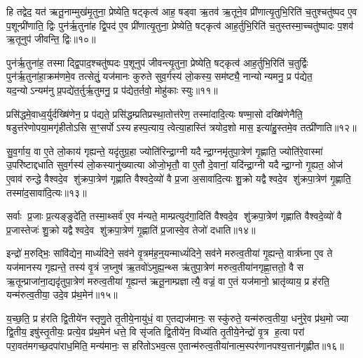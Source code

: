 हि तद्वेद॒ यत॑ ऋतू॒नाम्मुख॑मृ॒तुना॒ प्रेष्येति॒ षट्कृत्व॑ आह॒ षड्वा ऋ॒तव॑ ऋ॒तूने॒व प्री॑णात्यृ॒तुभि॒रिति॑ च॒तुश्चतु॑ष्पद ए॒व प॒शून्प्री॑णाति॒ द्विः पुन॑र्\mbox{}ऋ॒तुना॑ह द्वि॒पद॑ ए॒व प्री॑णात्यृ॒तुना॒ प्रेष्येति॒ षट्कृत्व॑ आह॒र्तुभि॒रिति॑ च॒तुस्तस्मा॒च्चतु॑ष्पादः प॒शव॑ ऋ॒तूनुप॑ जीवन्ति॒ द्विः॥१०॥

पुन॑र्\mbox{}ऋ॒तुना॑ह॒ तस्माद्द्वि॒पाद॒श्चतु॑ष्पदः प॒शूनुप॑ जीवन्त्यृ॒तुना॒ प्रेष्येति॒ षट्कृत्व॑ आह॒र्तुभि॒रिति॑ च॒तुर्द्विः पुन॑र्\mbox{}ऋ॒तुना॑हा॒क्रम॑णमे॒व तत्सेतुं॒ यज॑मानः कुरुते सुव॒र्गस्य॑ लो॒कस्य॒ सम॑ष्ट्यै॒ नान्योन्यमनु॒ प्र प॑द्येत॒ यद॒न्योऽन्यम॑नु प्र॒पद्ये॑त॒र्तुर्\mbox{}ऋ॒तुमनु॒ प्र प॑द्येत॒र्तवो॒ मोहु॑काः स्युः॥११॥

प्रसि॑द्धमे॒वाध्व॒र्युर्दख्षि॑णेन॒ प्र प॑द्यते॒ प्रसि॑द्धम्प्रतिप्रस्था॒तोत्त॑रेण॒ तस्मा॑दादि॒त्यः षण्मा॒सो दख्षि॑णेनैति॒ षडुत्त॑रेणोपया॒मगृ॑हीतोऽसि स॒ꣳ॒सर्पोऽस्यहस्प॒त्याय॒ त्वेत्या॒हास्ति॑ त्रयोद॒शो मास॒ इत्या॑हु॒स्तमे॒व तत्प्री॑णाति॥१२॥

{\anuvakamend[{को जी॑वन्ति॒ द्विः स्यु॒श्चतु॑स्त्रिशच्च॥३॥}]}

सु॒व॒र्गाय॒ वा ए॒ते लो॒काय॑ गृह्यन्ते॒ यदृ॑तुग्र॒हा ज्योति॑रिन्द्रा॒ग्नी यदैन्द्रा॒ग्नमृ॑तुपा॒त्रेण॑ गृ॒ह्णाति॒ ज्योति॑रे॒वास्मा॑ उ॒परि॑ष्टाद्दधाति सुव॒र्गस्य॑ लो॒कस्यानु॑ख्यात्या ओजो॒भृतौ॒ वा ए॒तौ दे॒वानां॒ यदि॑न्द्रा॒ग्नी यदैन्द्रा॒ग्नो गृ॒ह्यत॒ ओज॑ ए॒वाव॑ रुन्द्धे वैश्वदे॒व शु॑क्रपा॒त्रेण॑ गृह्णाति वैश्वदे॒व्यो॑ वै प्र॒जा अ॒सावा॑दि॒त्यः शु॒क्रो यद्वैश्वदे॒व शु॑क्रपा॒त्रेण॑ गृ॒ह्णाति॒ तस्मा॑द॒सावा॑दि॒त्यः॥१३॥

सर्वाः प्र॒जाः प्र॒त्यङ्ङुदे॑ति॒ तस्मा॒थ्सर्व॑ ए॒व म॑न्यते॒ माम्प्रत्युद॑गा॒दिति॑ वैश्वदे॒व शु॑क्रपा॒त्रेण॑ गृह्णाति वैश्वदे॒व्यो॑ वै प्र॒जास्तेजः॑ शु॒क्रो यद्वैश्वदे॒व शु॑क्रपा॒त्रेण॑ गृ॒ह्णाति॑ प्र॒जास्वे॒व तेजो॑ दधाति॥१४॥

{\anuvakamend[{तस्मा॑द॒सावा॑दि॒त्यस्त्रि॒ꣳ॒शच्च॑॥४॥}]}

इन्द्रो॑ म॒रुद्भिः॒ सांवि॑द्येन॒ माध्यं॑दिने॒ सव॑ने वृ॒त्रम॑ह॒न्॒यन्माध्यं॑दिने॒ सव॑ने मरुत्व॒तीया॑ गृ॒ह्यन्ते॒ वार्त्र॑घ्ना ए॒व ते यज॑मानस्य गृह्यन्ते॒ तस्य॑ वृ॒त्रं ज॒घ्नुष॑ ऋ॒तवो॑ऽमुह्य॒न्थ्स ऋ॑तुपा॒त्रेण॑ मरुत्व॒तीया॑नगृह्णा॒त्ततो॒ वै स ऋ॒तून्प्राजा॑ना॒द्यदृ॑तुपा॒त्रेण॑ मरुत्व॒तीया॑ गृ॒ह्यन्त॑ ऋतू॒नाम्प्रज्ञात्यै॒ वज्रं॒ वा ए॒तं यज॑मानो॒ भ्रातृ॑व्याय॒ प्र ह॑रति॒ यन्म॑रुत्व॒तीया॒ उदे॒व प्र॑थ॒मेन॑॥१५॥

य॒च्छ॒ति॒ प्र ह॑रति द्वि॒तीये॑न स्तृणु॒ते तृ॒तीये॒नायु॑धं॒ वा ए॒तद्यज॑मानः॒ सस्कु॑रुते॒ यन्म॑रुत्व॒तीया॒ धनु॑रे॒व प्र॑थ॒मो ज्या द्वि॒तीय॒ इषु॑स्तृ॒तीयः॒ प्रत्ये॒व प्र॑थ॒मेन॑ धत्ते॒ वि सृ॑जति द्वि॒तीये॑न॒ विध्य॑ति तृ॒तीये॒नेन्द्रो॑ वृ॒त्र ह॒त्वा परां परा॒वत॑मगच्छ॒दपा॑राध॒मिति॒ मन्य॑मानः॒ स हरि॑तोऽभव॒त्स ए॒तान्म॑रुत्व॒तीया॑नात्म॒स्पर॑णानपश्य॒त्तान॑गृह्णीत॥१६॥


